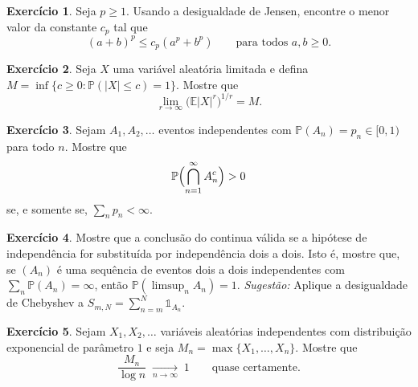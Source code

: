 \documentclass[12pt,portuguese]{article}
\theoremstyle{definition}
\theoremstyle{plainexercise}
\newtheorem{exercise}{Exercício}
\theoremstyle{starredexercise}
\newtheorem{starredexercise}[exercise]{Exercício}
\theoremstyle{definition}
\begin{document}
\begin{exercise}\label{exercise:lyapunov-potencia}
Seja $p\geqslant1$. Usando a desigualdade de Jensen, encontre o menor valor da
constante $c_p$ tal que
\[
(a+b)^p\leqslant c_p(a^p+b^p)
\qquad
\text{para todos }a,b\geqslant0.
\]
\end{exercise}

\begin{exercise}\label{exercise:supremo-essencial}
Seja $X$ uma variável aleatória limitada e defina
$M=\inf\{c\geqslant0:\mathbb{P}(|X|\leqslant c)=1\}$. Mostre que
\[
\lim_{r\to\infty}\bigl(\mathbb{E}|X|^r\bigr)^{1/r}=M.
\]
\end{exercise}

\begin{exercise}\label{exercise:bc-produto}
Sejam $A_1,A_2,\ldots$ eventos independentes com $\mathbb{P}(A_n)=p_n\in[0,1)$
para todo $n$. Mostre que
\[
\mathbb{P}\Bigl(\bigcap_{n=1}^{\infty}A_n^c\Bigr)>0
\]
se, e somente se, $\sum_n p_n<\infty$.
\end{exercise}

\begin{starredexercise}\label{exercise:bc-dois-a-dois}
Mostre que a conclusão do  continua válida se a hipótese de
independência for substituída por independência dois a dois. Isto é, mostre
que, se $(A_n)$ é uma sequência de eventos dois a dois independentes com
$\sum_n\mathbb{P}(A_n)=\infty$, então
$\mathbb{P}(\limsup_n A_n)=1$.
\emph{Sugestão:} Aplique a desigualdade de Chebyshev a
$S_{m,N}=\sum_{n=m}^{N}\mathds{1}_{A_n}$.
\end{starredexercise}

\begin{exercise}\label{exercise:bc-exponencial}
Sejam $X_1,X_2,\ldots$ variáveis aleatórias independentes com distribuição
exponencial de parâmetro $1$ e seja $M_n=\max\{X_1,\ldots,X_n\}$. Mostre que
\[
\frac{M_n}{\log n}\;\xrightarrow[n\to\infty]{}\;1
\qquad
\text{quase certamente}.
\]
\end{exercise}



\end{document}

